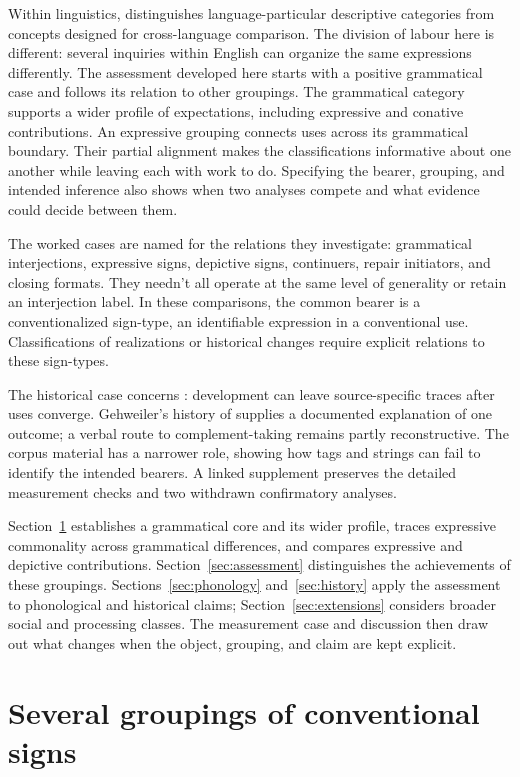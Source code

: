 \documentclass[12pt]{article}
\begin{document}
Within linguistics, \textcite[663, 666, 680]{haspelmath2010} distinguishes
language-particular descriptive categories from concepts designed for
cross-language comparison. The division of labour here is different:
several inquiries within English can organize the same expressions
differently. The assessment developed here starts with a positive grammatical
case and follows its relation to other groupings. The grammatical category
supports a wider profile of expectations, including expressive and conative
contributions. An expressive grouping connects uses across its grammatical
boundary. Their partial alignment makes the classifications informative
about one another while leaving each with work to do. Specifying the bearer, grouping, and intended inference also
shows when two analyses compete and what evidence could decide between them.

The worked cases are named for the relations they investigate: grammatical
interjections, expressive signs, depictive signs, continuers, repair
initiators, and closing formats. They needn't all operate at the same level
of generality or retain an interjection label. In these comparisons, the
common bearer is a conventionalized sign-type, an identifiable expression
in a conventional use. Classifications of realizations or historical
changes require explicit relations to these sign-types.

The historical case concerns : development can leave
source-specific traces after uses converge. Gehweiler's history of
 supplies a documented explanation of one outcome; a verbal
route to complement-taking  remains partly reconstructive.
The corpus material has a narrower role, showing how tags and strings
can fail to identify the intended bearers. A linked supplement preserves
the detailed measurement checks and two withdrawn confirmatory analyses.

Section~\ref{sec:worked} establishes a grammatical core and its wider profile, traces expressive
commonality across grammatical differences, and compares expressive and depictive
contributions. Section~\ref{sec:assessment} distinguishes the achievements
of these groupings. Sections~\ref{sec:phonology} and~\ref{sec:history}
apply the assessment to phonological and historical claims;
Section~\ref{sec:extensions} considers broader social and processing
classes. The measurement case and discussion then draw out what changes
when the object, grouping, and claim are kept explicit.

\section{Several groupings of conventional signs}\label{sec:worked}
\end{document}
